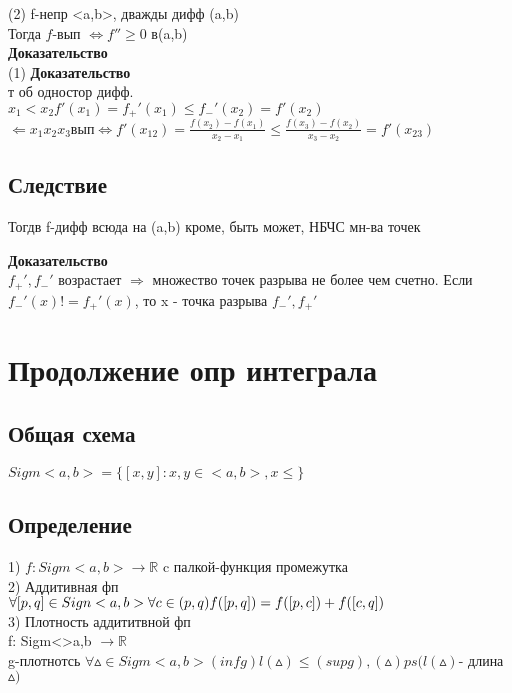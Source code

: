 \documentclass[12pt, a4paper]{article}
\begin{document}
  (2) f-непр <a,b>, дважды дифф (a,b) \\
  Тогда $f$-вып  $\Longleftrightarrow f'' \geq 0$ в(a,b) \\
  
    \textbf{Доказательство} \\
    (1)   \textbf{Доказательство} \\ т об одностор дифф. \\
  $ x_1<x_2 f'(x_1)=f_+'(x_1)\leq  f_-'(x_2)=f'(x_2)$ \\
  $ \Leftarrow x_1 x_2 x_3 вып \Longleftrightarrow   f'(x_{12})=\frac{f(x_2)-f(x_1)}{x_2-x_1} \leq  \frac{f(x_3)-f(x_2)}{x_3-x_2}=f'(x_{23})$ \\
   
    \subsection{Следствие}
    Тогдв f-дифф всюда на (a,b) кроме, быть может,  НБЧС  мн-ва точек
    
     \textbf{Доказательство} \\
    $f_+', f_-'$ возрастает $\Rightarrow$ множество точек разрыва не более чем счетно. Если $f_-'(x) != f_+'(x)$, то x - точка разрыва  $f_-',f_+'$ \\
     
\section{Продолжение опр интеграла}
    
    \subsection{Общая схема}
    
    $Sigm<a,b> = \lbrace[x,y]:x,y \in <a,b>,x\leq \rbrace$ \\
    
     \subsection{Определение}
     1) $f: Sigm<a,b> \rightarrow \mathbb{R}$ c палкой-функция промежутка \\
     2) Аддитивная фп \\
      $\forall [p,q] \in Sign<a,b> \forall c \in(p,q) \\
     f([p,q])= f([p,c])+f([c,q])$\\
     3) Плотность аддититвной фп \\
     f: Sigm<>a,b $\rightarrow \mathbb{R}$\\
     g-плотнотсь $\forall \vartriangle \in Sigm <a,b> (inf g)l(\vartriangle)\leq(sup g ) ,(\vartriangle) ps(l(\vartriangle)$- длина $\vartriangle)$\\
     
\end{document}
